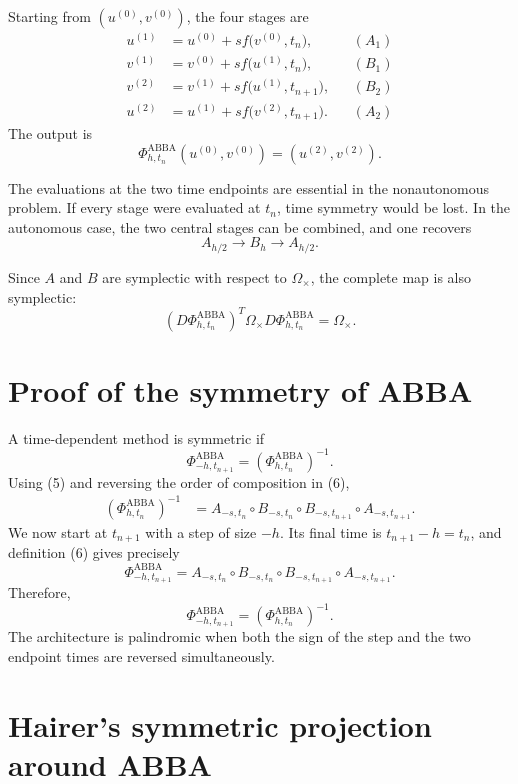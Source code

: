 \documentclass[11pt,a4paper]{article}
\newcommand{\Om}{\Omega_{\times}}
\newcommand{\PhiAB}{\Phi^{\mathrm{ABBA}}_{h,t_n}}
\begin{document}
Starting from $(u^{(0)},v^{(0)})$, the four stages are
\begin{align}
 u^{(1)}
 &=u^{(0)}+s f\bigl(v^{(0)},t_n\bigr), &&(A_1) \tag{7a}\\
 v^{(1)}
 &=v^{(0)}+s f\bigl(u^{(1)},t_n\bigr), &&(B_1) \tag{7b}\\
 v^{(2)}
 &=v^{(1)}+s f\bigl(u^{(1)},t_{n+1}\bigr), &&(B_2) \tag{7c}\\
 u^{(2)}
 &=u^{(1)}+s f\bigl(v^{(2)},t_{n+1}\bigr). &&(A_2) \tag{7d}
\end{align}
The output is
\[
 \PhiAB(u^{(0)},v^{(0)})=(u^{(2)},v^{(2)}).
\]

The evaluations at the two time endpoints are essential in the nonautonomous problem.
If every stage were evaluated at $t_n$, time symmetry would be lost. In the autonomous
case, the two central stages can be combined, and one recovers
\[
 A_{h/2}\longrightarrow B_h\longrightarrow A_{h/2}.
\]

Since $A$ and $B$ are symplectic with respect to $\Om$, the complete map is also symplectic:
\[
 \boxed{
 (D\PhiAB)^T\Om D\PhiAB=\Om.
 } \tag{8}
\]

\section{Proof of the symmetry of ABBA}

A time-dependent method is symmetric if
\[
 \Phi^{\mathrm{ABBA}}_{-h,t_{n+1}}
 =\left(\Phi^{\mathrm{ABBA}}_{h,t_n}\right)^{-1}. \tag{9}
\]
Using (5) and reversing the order of composition in (6),
\begin{align*}
 \left(\Phi^{\mathrm{ABBA}}_{h,t_n}\right)^{-1}
 &={}
 A_{-s,t_n}
 \circ B_{-s,t_n}
 \circ B_{-s,t_{n+1}}
 \circ A_{-s,t_{n+1}}.
\end{align*}
We now start at $t_{n+1}$ with a step of size $-h$. Its final time is
$t_{n+1}-h=t_n$, and definition (6) gives precisely
\[
 \Phi^{\mathrm{ABBA}}_{-h,t_{n+1}}
 =A_{-s,t_n}
  \circ B_{-s,t_n}
  \circ B_{-s,t_{n+1}}
  \circ A_{-s,t_{n+1}}.
\]
Therefore,
\[
 \boxed{
 \Phi^{\mathrm{ABBA}}_{-h,t_{n+1}}
 =\left(\Phi^{\mathrm{ABBA}}_{h,t_n}\right)^{-1}.
 }
\]
The architecture is palindromic when both the sign of the step and the two endpoint times
are reversed simultaneously.

\section{Hairer's symmetric projection around ABBA}
\end{document}
